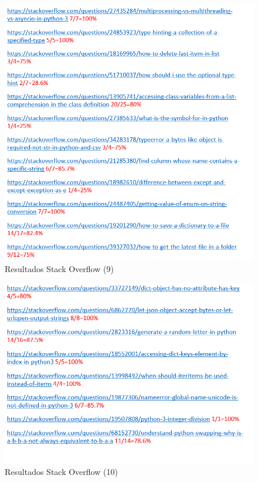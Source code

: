 \documentclass[a4paper, 12pt]{book}
\begin{document}
\begin{figure}
	\centering
    \includegraphics[width=1\textwidth]{img/stack13}
    \caption{Resultados Stack Overflow (9)}
    \label{figura:stack13}
 \end{figure}
 
\begin{figure}
	\centering
    \includegraphics[width=1\textwidth]{img/stack14}
    \caption{Resultados Stack Overflow (10)}
    \label{figura:stack14}
 \end{figure}
 
\end{document}
